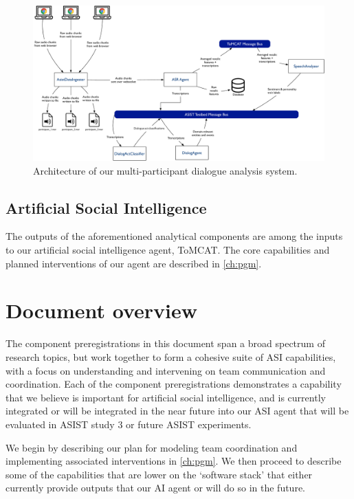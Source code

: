\begin{figure}
    \centering
    \includegraphics[width=6in]{images/nlp_architecture}
    \caption{Architecture of our multi-participant dialogue analysis system.}
    \label{fig:nlp-architecture}
\end{figure}

\subsection{Artificial Social Intelligence}

The outputs of the aforementioned analytical components are among the inputs to
our artificial social intelligence agent, ToMCAT. The core capabilities and
planned interventions of our agent are described in \autoref{ch:pgm}.

\section{Document overview}


The component preregistrations in this document span a broad spectrum of
research topics, but work together to form a cohesive suite of ASI
capabilities, with a focus on understanding and intervening on team
communication and coordination.
Each of the component preregistrations demonstrates a capability that we
believe is important for artificial social intelligence, and is currently
integrated or will be integrated in the near future into our ASI agent that
will be evaluated in ASIST study 3 or future ASIST experiments.

We begin by describing our plan for modeling team coordination and implementing
associated interventions in \autoref{ch:pgm}.  We then proceed to describe some
of the capabilities that are lower on the `software stack' that either
currently provide outputs that our AI agent or will do so in the future.

